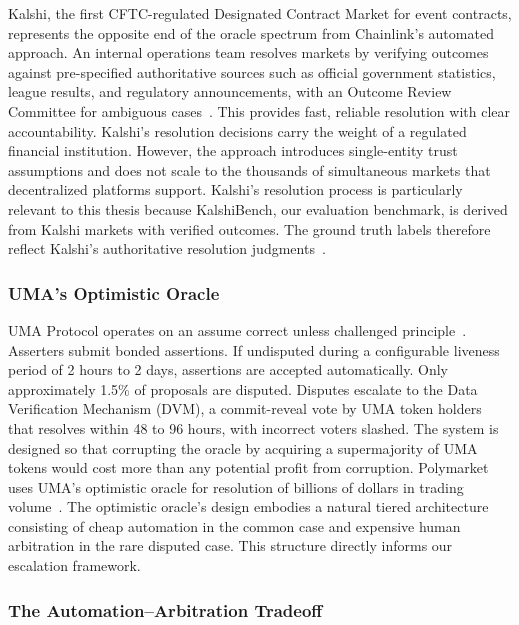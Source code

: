 Kalshi, the first CFTC-regulated Designated Contract Market for event contracts, represents the opposite end of the oracle spectrum from Chainlink's automated approach. An internal operations team resolves markets by verifying outcomes against pre-specified authoritative sources such as official government statistics, league results, and regulatory announcements, with an Outcome Review Committee for ambiguous cases~\cite{kalshi_outcomes}. This provides fast, reliable resolution with clear accountability. Kalshi's resolution decisions carry the weight of a regulated financial institution. However, the approach introduces single-entity trust assumptions and does not scale to the thousands of simultaneous markets that decentralized platforms support. Kalshi's resolution process is particularly relevant to this thesis because KalshiBench, our evaluation benchmark, is derived from Kalshi markets with verified outcomes. The ground truth labels therefore reflect Kalshi's authoritative resolution judgments~\cite{nel2025kalshibench}.

\subsubsection{UMA's Optimistic Oracle}

UMA Protocol operates on an assume correct unless challenged principle~\cite{uma2024oracle}. Asserters submit bonded assertions. If undisputed during a configurable liveness period of 2 hours to 2 days, assertions are accepted automatically. Only approximately 1.5\% of proposals are disputed. Disputes escalate to the Data Verification Mechanism (DVM), a commit-reveal vote by UMA token holders that resolves within 48 to 96 hours, with incorrect voters slashed. The system is designed so that corrupting the oracle by acquiring a supermajority of UMA tokens would cost more than any potential profit from corruption. Polymarket uses UMA's optimistic oracle for resolution of billions of dollars in trading volume~\cite{polymarket_uma_adapter}. The optimistic oracle's design embodies a natural tiered architecture consisting of cheap automation in the common case and expensive human arbitration in the rare disputed case. This structure directly informs our escalation framework.


\subsubsection{The Automation--Arbitration Tradeoff}


